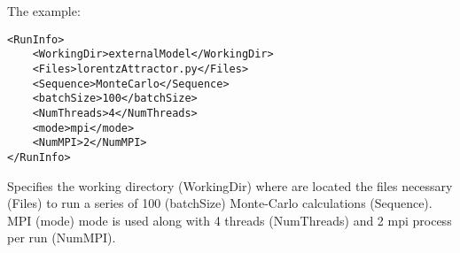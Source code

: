 The example:
\begin{lstlisting}[style=XML]
<RunInfo>
    <WorkingDir>externalModel</WorkingDir>
    <Files>lorentzAttractor.py</Files>
    <Sequence>MonteCarlo</Sequence>
    <batchSize>100</batchSize>
    <NumThreads>4</NumThreads>    
    <mode>mpi</mode>
    <NumMPI>2</NumMPI>
</RunInfo>
\end{lstlisting}
Specifies the working directory (WorkingDir) where are located the files necessary (Files) to run a series of 100 (batchSize) Monte-Carlo calculations (Sequence).
MPI (mode) mode is used along with 4 threads (NumThreads) and 2 mpi process per run (NumMPI).
